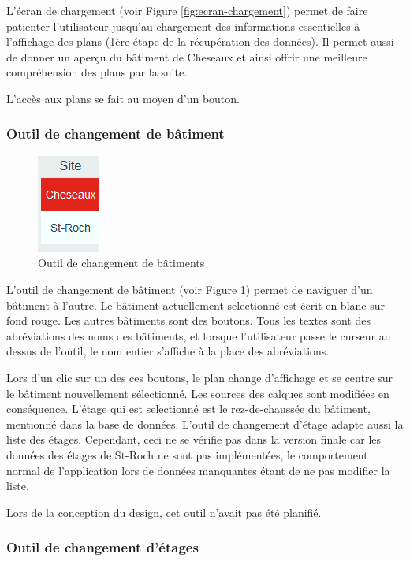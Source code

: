 \documentclass[
    iai, %
    il, %
]{heig-tb}
\begin{document}
L'écran de chargement (voir Figure \ref{fig:ecran-chargement}) permet de faire patienter l'utilisateur jusqu'au chargement des informations essentielles à l'affichage des plans
(1ère étape de la récupération des données).
Il permet aussi de donner un aperçu du bâtiment de Cheseaux et ainsi offrir une meilleure compréhension des plans par la suite.

L'accès aux plans se fait au moyen d'un bouton.

\subsubsection{Outil de changement de bâtiment}

\begin{figure}[h]
    \centering
    \includegraphics[scale=0.8]{frontend-buildingChange.png}
    \caption{Outil de changement de bâtiments}
    \label{fig:changement-batiment}
\end{figure}

L'outil de changement de bâtiment (voir Figure \ref{fig:changement-batiment}) permet de naviguer d'un bâtiment à l'autre.
Le bâtiment actuellement selectionné est écrit en blanc sur fond rouge. Les autres bâtiments sont des boutons.
Tous les textes  sont des abréviations des noms des bâtiments, et lorsque l'utilisateur passe le curseur au dessus de l'outil,
le nom entier s'affiche à la place des abréviations.

Lors d'un clic sur un des ces boutons, le plan change d'affichage et se centre sur le bâtiment nouvellement sélectionné.
Les sources des calques sont modifiées en conséquence.
L'étage qui est selectionné est le rez-de-chaussée du bâtiment, mentionné dans la base de données.
L'outil de changement d'étage adapte aussi la liste des étages.
Cependant, ceci ne se vérifie pas dans la version finale car les données des étages de St-Roch ne sont pas implémentées,
le comportement normal de l'application lors de données manquantes étant de ne pas modifier la liste.

Lors de la conception du design, cet outil n'avait pas été planifié.

\subsubsection{Outil de changement d'étages}
\end{document}
